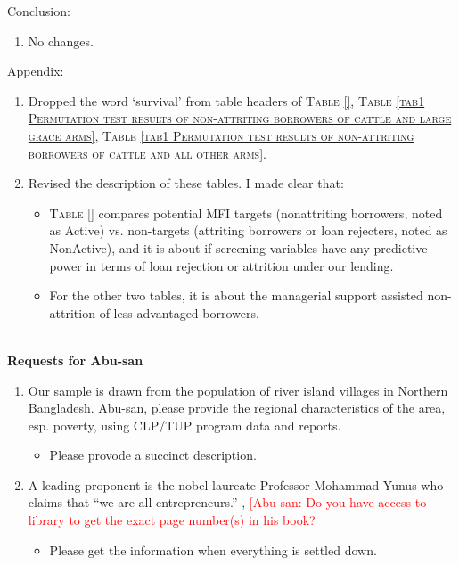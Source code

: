 Conclusion:
\begin{enumerate}
\vspace{1.0ex}\setlength{\itemsep}{1.0ex}\setlength{\baselineskip}{12pt}
\item	No changes.
\end{enumerate}
Appendix:
\begin{enumerate}
\vspace{1.0ex}\setlength{\itemsep}{1.0ex}\setlength{\baselineskip}{12pt}
\item	Dropped the word `survival' from table headers of 
\textsc{\normalsize Table \ref{}}, 
\textsc{\normalsize Table \ref{tab1 Permutation test results of non-attriting borrowers of cattle and large grace arms}}, 
\textsc{\normalsize Table \ref{tab1 Permutation test results of non-attriting borrowers of cattle and all other arms}}. 
\item	Revised the description of these tables. I made clear that:
	\begin{itemize}
	\vspace{1.0ex}\setlength{\itemsep}{1.0ex}\setlength{\baselineskip}{12pt}
	\item	\textsc{\normalsize Table \ref{}} compares potential MFI targets (nonattriting borrowers, noted as \textsf{Active}) vs. non-targets (attriting borrowers or loan rejecters, noted as \textsf{NonActive}), and it is about if screening variables have any predictive power in terms of loan rejection or attrition under our lending. 
	\item	For the other two tables, it is about the managerial support assisted non-attrition of less advantaged borrowers. \\~\\
	\end{itemize} 
\end{enumerate}
\textbf{Requests for Abu-san}
\begin{enumerate}
\vspace{1.0ex}\setlength{\itemsep}{1.0ex}\setlength{\baselineskip}{12pt}
\item		Our sample is drawn from the population of river island villages in Northern Bangladesh. Abu-san, please provide the regional characteristics of the area, esp. poverty, using CLP/TUP program data and reports. 
	\begin{itemize}
	\vspace{1.0ex}\setlength{\itemsep}{1.0ex}\setlength{\baselineskip}{12pt}
	\item	Please provode a succinct description.
	\end{itemize}
\item	A leading proponent is the nobel laureate Professor Mohammad Yunus who claims that ``we are all entrepreneurs.'' \citet{Yunus2003}, \citet{Cosic2017} \textcolor{red}{[Abu-san: Do you have access to library to get the exact page number(s) in his book?}
	\begin{itemize}
	\vspace{1.0ex}\setlength{\itemsep}{1.0ex}\setlength{\baselineskip}{12pt}
	\item	Please get the information when everything is settled down.
	\end{itemize}
\end{enumerate}


